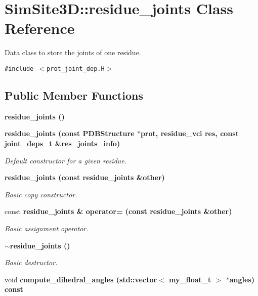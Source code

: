 \section{SimSite3D::residue\_\-joints Class Reference}
\label{classSimSite3D_1_1residue__joints}
Data class to store the joints of one residue.  


{\tt \#include $<$prot\_\-joint\_\-dep.H$>$}

\subsection*{Public Member Functions}
\begin{CompactItemize}
\item 
\bf{residue\_\-joints} ()
\item 
\bf{residue\_\-joints} (const \bf{PDBStructure} $\ast$prot, residue\_\-vci res, const joint\_\-deps\_\-t \&res\_\-joints\_\-info)\label{classSimSite3D_1_1residue__joints_8c38f7e8122a28e0153347a1dfe1b30c}

\begin{CompactList}\small\item\em Default constructor for a given residue. \item\end{CompactList}\item 
\bf{residue\_\-joints} (const \bf{residue\_\-joints} \&other)\label{classSimSite3D_1_1residue__joints_f449cdad0ca876373713c618657b0015}

\begin{CompactList}\small\item\em Basic copy constructor. \item\end{CompactList}\item 
const \bf{residue\_\-joints} \& \bf{operator=} (const \bf{residue\_\-joints} \&other)\label{classSimSite3D_1_1residue__joints_a2cac3126dd4e9d9909fca1d3de2a53a}

\begin{CompactList}\small\item\em Basic assignment operator. \item\end{CompactList}\item 
\bf{$\sim$residue\_\-joints} ()\label{classSimSite3D_1_1residue__joints_d09831082869cc7230c1c6315615e33b}

\begin{CompactList}\small\item\em Basic destructor. \item\end{CompactList}\item 
void \bf{compute\_\-dihedral\_\-angles} (std::vector$<$ my\_\-float\_\-t $>$ $\ast$angles) const \label{classSimSite3D_1_1residue__joints_43413c481de3d0a00b610b8c445405cd}


\end{CompactItemize}
